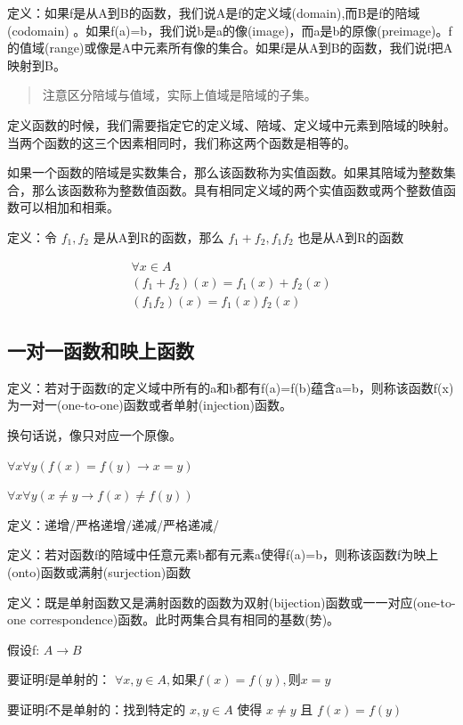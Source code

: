 \documentclass[12pt,a4paper,oneside]{ctexart}
\begin{document}
定义：如果f是从A到B的函数，我们说A是f的定义域(domain),而B是f的陪域(codomain) 。如果f(a)=b，我们说b是a的像(image)，而a是b的原像(preimage)。f的值域(range)或像是A中元素所有像的集合。如果f是从A到B的函数，我们说f把A映射到B。

\begin{quote}
注意区分陪域与值域，实际上值域是陪域的子集。
\end{quote}

定义函数的时候，我们需要指定它的定义域、陪域、定义域中元素到陪域的映射。当两个函数的这三个因素相同时，我们称这两个函数是相等的。

如果一个函数的陪域是实数集合，那么该函数称为实值函数。如果其陪域为整数集合，那么该函数称为整数值函数。具有相同定义域的两个实值函数或两个整数值函数可以相加和相乘。

定义：令 \(f_1,f_2\) 是从A到R的函数，那么 \(f_1+f_2,f_1f_2\) 也是从A到R的函数

\[\begin{gathered}
\forall x\in A\\
(f_1+f_2)(x)=f_1(x)+f_2(x)\\
(f_1f_2)(x)=f_1(x)f_2(x)
\end{gathered}\]

\subsection*{一对一函数和映上函数}

定义：若对于函数f的定义域中所有的a和b都有f(a)=f(b)蕴含a=b，则称该函数f(x)为一对一(one-to-one)函数或者单射(injection)函数。

换句话说，像只对应一个原像。

\(\forall x\forall y(f(x)=f(y)\rightarrow x=y)\)

\(\forall x\forall y(x\neq y\rightarrow f(x)\neq f(y))\)

定义：递增/严格递增/递减/严格递减/

定义：若对函数f的陪域中任意元素b都有元素a使得f(a)=b，则称该函数f为映上(onto)函数或满射(surjection)函数

定义：既是单射函数又是满射函数的函数为双射(bijection)函数或一一对应(one-to-one correspondence)函数。此时两集合具有相同的基数(势)。

假设f: \(A\rightarrow B\)

要证明f是单射的： \(\forall x,y\in A,\text{如果}f(x)=f(y),\text{则}x=y\)

要证明f不是单射的：找到特定的 \(x,y\in A\) 使得 \(x\neq y\) 且 \(f(x)= f(y)\)
\end{document}
